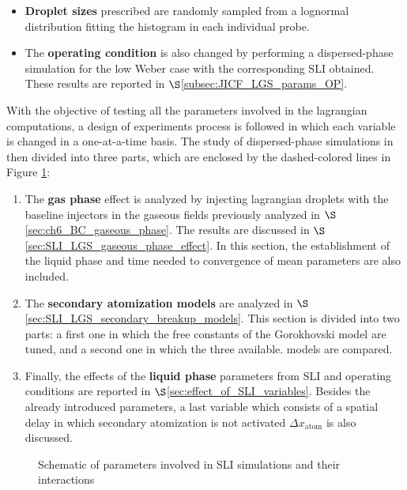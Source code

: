 \begin{itemize}
	\item \textbf{Droplet sizes} prescribed are randomly sampled from a lognormal distribution fitting the histogram in each individual probe. 
	
	\item The \textbf{operating condition} is also changed by performing a dispersed-phase simulation for the low Weber case with the corresponding SLI obtained. These results are reported in $\S$\ref{subsec:JICF_LGS_params_OP}.

\end{itemize}



With the objective of testing all the parameters involved in the lagrangian computations, a design of experiments process is followed in which each variable is changed in a one-at-a-time basis. The study of dispersed-phase simulations in then divided into three parts, which are enclosed by the dashed-colored lines in Figure  \ref{fig:dispersed_phase_sli_parameters}:

\begin{enumerate}

	\item The \textbf{gas phase} effect is analyzed by injecting lagrangian droplets with the baseline injectors in the gaseous fields previously analyzed in $\S$\ref{sec:ch6_BC_gaseous_phase}. The results are discussed in $\S$\ref{sec:SLI_LGS_gaseous_phase_effect}. In this section, the establishment of the liquid phase and time needed to convergence of mean parameters are also  included.
	
	\item The \textbf{secondary atomization models} are analyzed in $\S$\ref{sec:SLI_LGS_secondary_breakup_models}. This section is divided into two parts: a first one in which the free constants of the Gorokhovski model are tuned, and a second one in which the three available. models are compared.
	
	\item Finally, the effects of the \textbf{liquid phase} parameters from SLI and operating conditions are reported in $\S$\ref{sec:effect_of_SLI_variables}. Besides the already introduced parameters, a last variable which consists of a spatial delay in which secondary atomization is not activated $\Delta x_\mathrm{atom}$ is also discussed.

\end{enumerate}

\clearpage

\begin{figure}[ht]	
	\centering	{}
	\caption{Schematic of parameters involved in SLI simulations and their interactions}	\label{fig:dispersed_phase_sli_parameters}
\end{figure}

